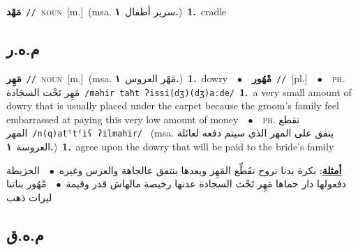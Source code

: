 \documentclass[10pt,a4paper,twoside]{article} %
\begin{document}
\begin{multicols}{2}
{\setlength\topsep{0pt}\textbf{\foreignlanguage{arabic}{مَهْد}}\ {\color{gray}\texttt{//}\color{black}}\ \textsc{noun}\ [m.]\ \color{gray}(msa. \foreignlanguage{arabic}{سرير أطفال}~\foreignlanguage{arabic}{\textbf{١.}})\color{black}\ \textbf{1.}~cradle\ } \vspace{2mm}

\vspace{-3mm}
\subsection*{\color{blue}\foreignlanguage{arabic}{م.ه.ر}\color{blue}{}} 

{\setlength\topsep{0pt}\textbf{\foreignlanguage{arabic}{مَهِر}}\ {\color{gray}\texttt{//}\color{black}}\ \textsc{noun}\ [m.]\ \color{gray}(msa. \foreignlanguage{arabic}{مَهْر العروس}~\foreignlanguage{arabic}{\textbf{١.}})\color{black}\ \textbf{1.}~dowry\ \ $\bullet$\ \ \setlength\topsep{0pt}\textbf{\foreignlanguage{arabic}{مْهُور}}\ {\color{gray}\texttt{//}\color{black}}\ [pl.]\ \ $\bullet$\ \ \textsc{ph.} \color{gray} \foreignlanguage{arabic}{مَهِر تَحْت السجَادة}\color{black}\ {\color{gray}\texttt{/{\sffamily mahir taħt ʔissi(dʒ)(dʒ)aːde}/}\color{black}}\ \textbf{1.}~a very small amount of dowry that is usually placed under the carpet because the groom's family feel embarrassed at paying this very low amount of money\ \ $\bullet$\ \ \textsc{ph.} \color{gray} \foreignlanguage{arabic}{نقطع المهر}\color{black}\ {\color{gray}\texttt{/{\sffamily n(q)atˤtˤiʕ ʔilmahir}/}\color{black}}\ \color{gray} (msa. \foreignlanguage{arabic}{يتفق على المهر الذي سيتم دفعه لعائلة العروسة}~\foreignlanguage{arabic}{\textbf{١.}})\color{black}\ \textbf{1.}~agree upon the dowry that will be paid to the bride's family\  \begin{flushright}\color{gray}\foreignlanguage{arabic}{\textbf{\underline{\foreignlanguage{arabic}{أمثلة}}}: بكرة بدنا نروح نقَطِّع المَهِر وبعدها بنتفق عالجاهة والعرس وغيره\ $\bullet$\ \  الحزيطة دفعولها دار حماها مَهِر تَحْت السجادة عدنها رخيصة مالهاش قدر وقيمة\ $\bullet$\ \  مْهُور بناتنا ليرات ذهب}\end{flushright}\color{black}} \vspace{2mm}

\vspace{-3mm}
\subsection*{\color{blue}\foreignlanguage{arabic}{م.ه.ق}\color{blue}{}} 


\end{multicols}
\end{document}
